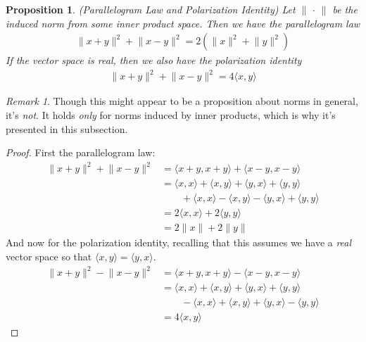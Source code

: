 \documentclass[12pt]{article}
\numberwithin{equation}{section} %
\theoremstyle{plain}
\newtheorem{prop}[thm]{Proposition}
\theoremstyle{definition}
\theoremstyle{remark}
\newtheorem*{rmk}{Remark}
\begin{document}
\begin{prop}\emph{(Parallelogram Law and Polarization Identity)}
Let $\lVert\,\cdot\,\rVert$ be the induced norm from some inner product
space.
Then we have the \emph{parallelogram law}
\begin{align*}
  \lVert x+y\rVert^2 +
  \lVert x-y\rVert^2 =
  2\left( \lVert x \rVert^2 + \lVert y \rVert^2 \right)
\end{align*}
If the vector space is \emph{real}, then we also have the
\emph{polarization identity}
\begin{align*}
  \lVert x+y\rVert^2 +
  \lVert x-y\rVert^2 = 4\langle x,y \rangle
\end{align*}
\end{prop}
\begin{rmk}
Though this might appear to be a proposition about norms in general,
it's \emph{not}. It holds \emph{only} for norms induced by inner
products, which is why it's presented in this subsection.
\end{rmk}
\begin{proof}
First the parallelogram law:
\begin{align*}
  \lVert x+y\rVert^2 +
  \lVert x-y\rVert^2
  &=
  \langle x+y, x+y\rangle
  + \langle x-y, x-y\rangle \\
  &=
  \langle x, x\rangle
  + \langle x, y\rangle
  + \langle y, x\rangle
  + \langle y, y\rangle \\
  &\qquad
  + \langle x, x\rangle
  - \langle x, y\rangle
  - \langle y, x\rangle
  + \langle y, y\rangle \\
  &=
  2\langle x, x\rangle
  + 2\langle y, y\rangle \\
  &=
  2\lVert x\rVert
  + 2\lVert y\rVert
\end{align*}
And now for the polarization identity, recalling that this assumes we
have a \emph{real} vector space so that
$\langle x,y\rangle = \langle y,x\rangle$.
\begin{align*}
  \lVert x+y\rVert^2 -
  \lVert x-y\rVert^2
  &=
  \langle x+y, x+y\rangle
  - \langle x-y, x-y\rangle \\
  &=
  \langle x, x\rangle
  + \langle x, y\rangle
  + \langle y, x\rangle
  + \langle y, y\rangle \\
  &\qquad
  - \langle x, x\rangle
  + \langle x, y\rangle
  + \langle y, x\rangle
  - \langle y, y\rangle \\
  &=
  4\langle x, y\rangle
\end{align*}
\end{proof}
\end{document}
